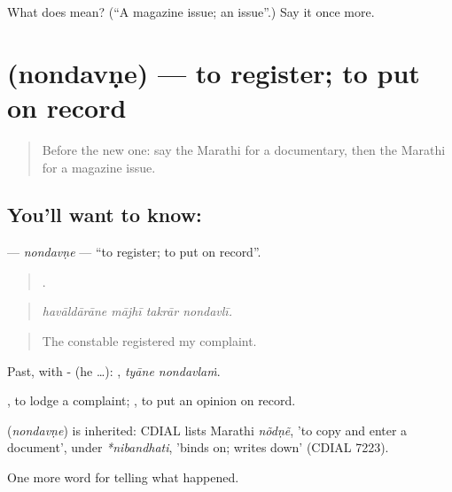 \begin{tcolorbox}[breakable,colback=teal!4,colframe=teal!35!black,title={Before you move on}]
What does  mean? (\textquotedblleft{}A magazine issue; an issue\textquotedblright{}.) Say it once more.
\end{tcolorbox}
\section[\texorpdfstring{\mr{नोंदवणे} (nondavṇe)}{नोंदवणे (nondavṇe)}]{ (nondavṇe) — to register; to put on record}

\label{lesson:MR-C315-nondavne}



\begin{quote}
Before the new one: say the Marathi for a documentary, then the Marathi for a magazine issue.
\end{quote}

\subsection*{You'll want to know: }
\textbf{} — \emph{nondavṇe} — \textquotedblleft{}to register; to put on record\textquotedblright{}.

\begin{quote}
   .
\end{quote}

\begin{quote}
\emph{havāldārāne mājhī takrār nondavlī.}
\end{quote}

\begin{quote}
The constable registered my complaint.
\end{quote}

Past, with - (he …):  , \emph{tyāne nondavlaṁ}.

 , to lodge a complaint;  , to put an opinion on record.

\begin{cousinweb}
\textbf{} (\emph{nondavṇe}) is inherited: CDIAL lists Marathi \emph{nõdṇẽ}, 'to copy and enter a document', under \emph{*nibandhati}, 'binds on; writes down' (CDIAL 7223).
\end{cousinweb}

\begin{grammarlens}[title={What you've built}]
One more word for telling what happened.
\end{grammarlens}

